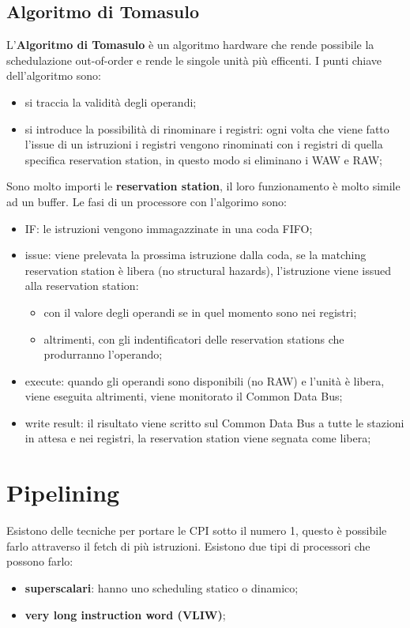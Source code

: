 \documentclass[12pt]{article}
\begin{document}
\subsection{Algoritmo di Tomasulo}
L'\textbf{Algoritmo di Tomasulo} \`e un algoritmo hardware che rende possibile la schedulazione out-of-order e rende le singole unit\`a pi\`u efficenti. I punti chiave dell'algoritmo sono:
\begin{itemize}
    \item si traccia la validit\`a degli operandi;
    \item si introduce la possibilit\`a di rinominare i registri: ogni volta che viene fatto l'issue di un istruzioni i registri vengono rinominati con i registri di quella specifica reservation station, in questo modo si eliminano i WAW e RAW;
\end{itemize}
Sono molto importi le \textbf{reservation station}, il loro funzionamento \`e molto simile ad un buffer. Le fasi di un processore con l'algorimo sono:
\begin{itemize}
    \item IF: le istruzioni vengono immagazzinate in una coda FIFO;
    \item issue: viene prelevata la prossima istruzione dalla coda, se la matching reservation station \`e libera (no structural hazards), l'istruzione viene issued alla reservation station:
        \begin{itemize}
            \item con il valore degli operandi se in quel momento sono nei registri;
            \item altrimenti, con gli indentificatori delle reservation stations che produrranno l'operando;
        \end{itemize}
    \item execute: quando gli operandi sono disponibili (no RAW) e l'unit\`a \`e libera, viene eseguita altrimenti, viene monitorato il Common Data Bus;
    \item write result: il risultato viene scritto sul Common Data Bus a tutte le stazioni in attesa e nei registri, la reservation station viene segnata come libera;
\end{itemize}



\newpage
\section{Pipelining}
Esistono delle tecniche per portare le CPI sotto il numero 1, questo \`e possibile farlo attraverso il fetch di pi\`u istruzioni. Esistono due tipi di processori che possono farlo:
\begin{itemize}
    \item \textbf{superscalari}: hanno uno scheduling statico o dinamico;
    \item \textbf{very long instruction word (VLIW)};
\end{itemize}
\end{document}
